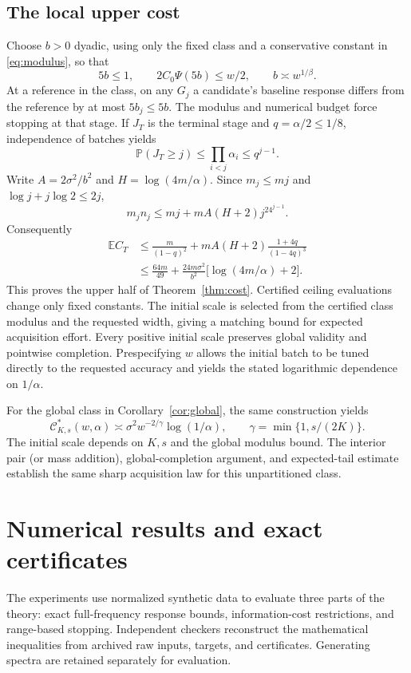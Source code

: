 \documentclass[10pt]{amsart}
\theoremstyle{definition}
\theoremstyle{remark}
\newcommand{\E}{\mathbb E}
\newcommand{\Prob}{\mathbb P}
\begin{document}
\subsection{The local upper cost}
Choose $b>0$ dyadic, using only the fixed class and a conservative constant in \eqref{eq:modulus}, so that
\begin{equation}\label{eq:bchoice}
 5b\le1,\qquad 2C_0\Psi(5b)\le w/2,\qquad b\asymp w^{1/\beta}.
\end{equation}
At a reference in the class, on any $G_j$ a candidate's baseline response differs from the reference by at most $5b_j\le5b$. The modulus and numerical budget force stopping at that stage. If $J_T$ is the terminal stage and $q=\alpha/2\le1/8$, independence of batches yields
\[
 \Prob(J_T\ge j)\le\prod_{i<j}\alpha_i\le q^{j-1}.
\]
Write $A=2\sigma^2/b^2$ and $H=\log(4m/\alpha)$. Since $m_j\le mj$ and $\log j+j\log2\le2j$,
\[
 m_jn_j\le mj+mA(H+2)j^24^{j-1}.
\]
Consequently
\begin{align}\label{eq:costupper}
 \E C_T
 &\le\frac{m}{(1-q)^2}
       +mA(H+2)\frac{1+4q}{(1-4q)^3}\\
 &\le\frac{64m}{49}
       +\frac{24m\sigma^2}{b^2}\bigl[\log(4m/\alpha)+2\bigr].\nonumber
\end{align}
This proves the upper half of Theorem~\ref{thm:cost}. Certified ceiling evaluations change only fixed constants. The initial scale is selected from the certified class modulus and the requested width, giving a matching bound for expected acquisition effort. Every positive initial scale preserves global validity and pointwise completion. Prespecifying $w$ allows the initial batch to be tuned directly to the requested accuracy and yields the stated logarithmic dependence on $1/\alpha$.

For the global class in Corollary~\ref{cor:global}, the same construction yields
\[
 \mathcal C^*_{K,s}(w,\alpha)
 \asymp \sigma^2w^{-2/\gamma}\log(1/\alpha),\qquad
 \gamma=\min\{1,s/(2K)\}.
\]
The initial scale depends on $K,s$ and the global modulus bound. The interior pair (or mass addition), global-completion argument, and expected-tail estimate establish the same sharp acquisition law for this unpartitioned class.

\section{Numerical results and exact certificates}\label{sec:experiments}
The experiments use normalized synthetic data to evaluate three parts of the theory: exact full-frequency response bounds, information-cost restrictions, and range-based stopping. Independent checkers reconstruct the mathematical inequalities from archived raw inputs, targets, and certificates. Generating spectra are retained separately for evaluation.
\end{document}

